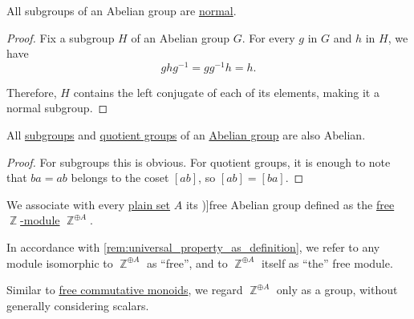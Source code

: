 \begin{proposition}\label{thm:abelian_normal_subgroups}
  All subgroups of an Abelian group are \hyperref[def:normal_subgroup]{normal}.
\end{proposition}
\begin{proof}
  Fix a subgroup \( H \) of an Abelian group \( G \). For every \( g \) in \( G \) and \( h \) in \( H \), we have
  \begin{equation*}
    g h g^{-1} = gg^{-1} h = h.
  \end{equation*}

  Therefore, \( H \) contains the left conjugate of each of its elements, making it a normal subgroup.
\end{proof}

\begin{proposition}\label{thm:abelian_subgroups_and_quotient_groups}
  All \hyperref[def:group/subobject]{subgroups} and \hyperref[def:group/quotient]{quotient groups} of an \hyperref[def:abelian_group]{Abelian group} are also Abelian.
\end{proposition}
\begin{proof}
  For subgroups this is obvious. For quotient groups, it is enough to note that \( ba = ab \) belongs to the coset \( [ab] \), so \( [ab] = [ba] \).
\end{proof}

\begin{definition}\label{def:free_abelian_group}
  We associate with every \hyperref[def:set]{plain set} \( A \) its \term[ru=свободная абелева группа (\cite[def. 9.1.1]{Винберг2014КурсАлгебры})]{free Abelian group} defined as the \hyperref[def:free_semimodule]{free \( \BbbZ \)-module} \( \BbbZ^{\oplus A} \).
\end{definition}
\begin{comments}
  \item In accordance with \cref{rem:universal_property_as_definition}, we refer to any module isomorphic to \( \BbbZ^{\oplus A} \) as \enquote{free}, and to \( \BbbZ^{\oplus A} \) itself as \enquote{the} free module.

  \item Similar to \hyperref[def:free_commutative_monoid]{free commutative monoids}, we regard \( \BbbZ^{\oplus A} \) only as a group, without generally considering scalars.
\end{comments}

